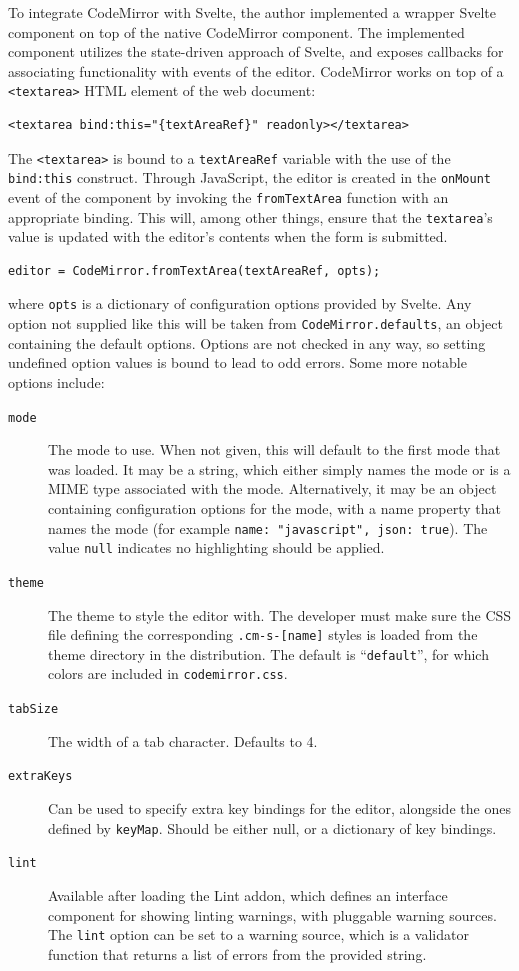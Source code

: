 \documentclass[english,engineering]{wizthesis}
\begin{document}
To integrate CodeMirror with Svelte, the author implemented a wrapper Svelte
component on top of the native CodeMirror component. The implemented component
utilizes the state-driven approach of Svelte, and exposes callbacks for
associating functionality with events of the editor. CodeMirror works on top of
a \texttt{<textarea>} HTML element of the web document:
\begin{verbatim}
<textarea bind:this="{textAreaRef}" readonly></textarea>
\end{verbatim}
The \texttt{<textarea>} is bound to a \texttt{textAreaRef} variable with the use
of the \texttt{bind:this} construct. Through JavaScript, the editor is created
in the \texttt{onMount} event of the component by invoking the
\texttt{fromTextArea} function with an appropriate binding. This will, among
other things, ensure that the \texttt{textarea}'s value is updated with the
editor's contents when the form is submitted.
\begin{verbatim}
editor = CodeMirror.fromTextArea(textAreaRef, opts);
\end{verbatim}
where \texttt{opts} is a dictionary of configuration options provided by Svelte.
Any option not supplied like this will be taken from
\texttt{CodeMirror.defaults}, an object containing the default options. Options
are not checked in any way, so setting undefined option values is bound to lead
to odd errors. Some more notable options include:
\begin{description}
  \item[\texttt{mode}] The mode to use. When not given, this will default to the
  first mode that was loaded. It may be a string, which either simply names the
  mode or is a MIME type associated with the mode. Alternatively, it may be an
  object containing configuration options for the mode, with a name property
  that names the mode (for example \texttt{{name: "javascript", json: true}}).
  The value \texttt{null} indicates no highlighting should be applied.
  \item[\texttt{theme}] The theme to style the editor with. The developer must
  make sure the CSS file defining the corresponding \texttt{.cm-s-[name]} styles
  is loaded from the theme directory in the distribution. The default is
  ``\texttt{default}'', for which colors are included in
  \texttt{codemirror.css}.
  \item[\texttt{tabSize}] The width of a tab character. Defaults to 4.
  \item[\texttt{extraKeys}] Can be used to specify extra key bindings for the
  editor, alongside the ones defined by \texttt{keyMap}. Should be either null,
  or a dictionary of key bindings.
  \item[\texttt{lint}] Available after loading the Lint addon, which defines an
  interface component for showing linting warnings, with pluggable warning
  sources. The \texttt{lint} option can be set to a warning source, which is a
  validator function that returns a list of errors from the provided string.
\end{description}
\end{document}
